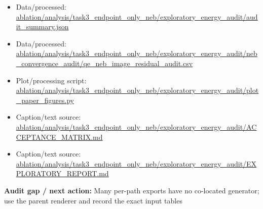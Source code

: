 \documentclass[10pt]{article}
\newcommand{\statusline}[1]{\colorbox{gray!12}{\parbox{0.96\linewidth}{#1}}}
\begin{document}
\begin{itemize}[leftmargin=1.4em,noitemsep]
\item Data/processed: \begingroup\scriptsize\url{ablation/analysis/task3_endpoint_only_neb/exploratory_energy_audit/audit_summary.json}\endgroup
\item Data/processed: \begingroup\scriptsize\url{ablation/analysis/task3_endpoint_only_neb/exploratory_energy_audit/neb_convergence_audit/qe_neb_image_residual_audit.csv}\endgroup
\item Plot/processing script: \begingroup\scriptsize\url{ablation/analysis/task3_endpoint_only_neb/exploratory_energy_audit/plot_paper_figures.py}\endgroup
\item Caption/text source: \begingroup\scriptsize\url{ablation/analysis/task3_endpoint_only_neb/exploratory_energy_audit/ACCEPTANCE_MATRIX.md}\endgroup
\item Caption/text source: \begingroup\scriptsize\url{ablation/analysis/task3_endpoint_only_neb/exploratory_energy_audit/EXPLORATORY_REPORT.md}\endgroup
\end{itemize}
\statusline{\textbf{Audit gap / next action:} Many per-path exports have no co-located generator; use the parent renderer and record the exact input tables}
\vfill
\clearpage
\end{document}

